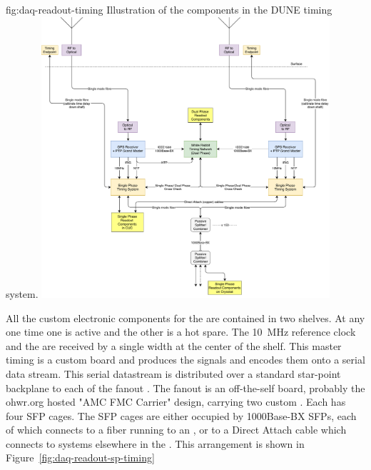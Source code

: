 \documentclass[final]{dune}
\begin{document}
\begin{dunefigure}{fig:daq-readout-timing}
  {Illustration of the components in the DUNE timing system.}
\includegraphics[width=0.8\textwidth]{daq-timing-block-diagram-tdr_2nov18.pdf}
\end{dunefigure}

All the custom electronic components for the  are contained in two
 shelves. At any one time one is active and the other is a
hot spare. The \SI{10}{\MHz} reference clock and the  are received
by a single width  at the center of the  shelf. This
master timing  is a custom board and produces the  signals and encodes them onto a
serial data stream. This serial datastream is distributed over a
standard star-point backplane to each of the fanout . The fanout  is an off-the-self board, probably the ohwr.org hosted "AMC FMC Carrier" design, carrying two custom . Each  has four SFP cages. The SFP cages are either occupied by
1000Base-BX SFPs, each of which connects to a fiber running to an ,
or to a Direct Attach cable which connects to systems elsewhere in the
. This
arrangement is shown in Figure~\ref{fig:daq-readout-sp-timing}
\end{document}
